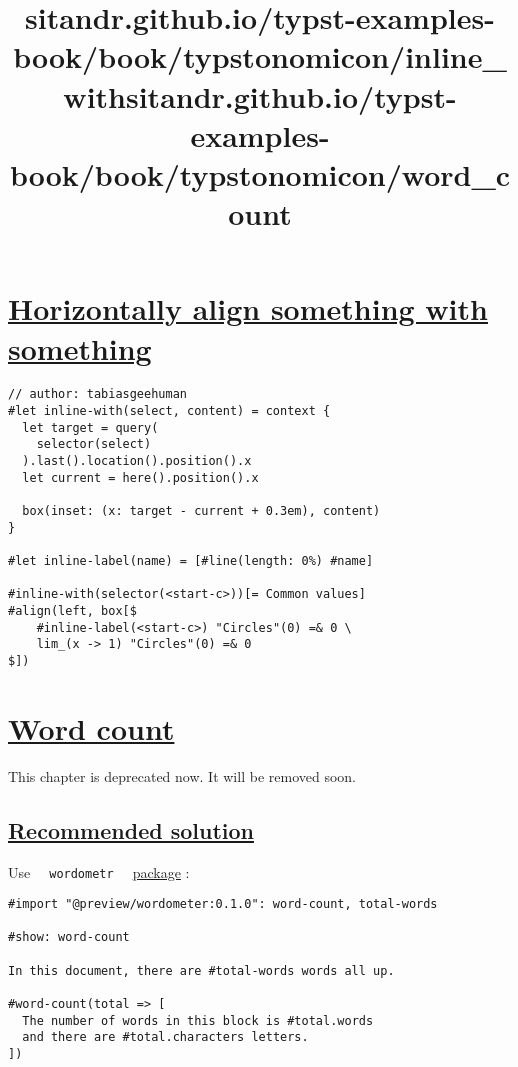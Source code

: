 \title{sitandr.github.io/typst-examples-book/book/typstonomicon/inline_with}

\section{\texorpdfstring{\hyperref[horizontally-align-something-with-something]{Horizontally
align something with
something}}{Horizontally align something with something}}\label{horizontally-align-something-with-something}

\begin{verbatim}
// author: tabiasgeehuman
#let inline-with(select, content) = context {
  let target = query(
    selector(select)
  ).last().location().position().x
  let current = here().position().x

  box(inset: (x: target - current + 0.3em), content)
}

#let inline-label(name) = [#line(length: 0%) #name]

#inline-with(selector(<start-c>))[= Common values]
#align(left, box[$
    #inline-label(<start-c>) "Circles"(0) =& 0 \
    lim_(x -> 1) "Circles"(0) =& 0
$])
\end{verbatim}

\pandocbounded{}


\title{sitandr.github.io/typst-examples-book/book/typstonomicon/word_count}

\section{\texorpdfstring{\hyperref[word-count]{Word
count}}{Word count}}\label{word-count}

This chapter is deprecated now. It will be removed soon.

\subsection{\texorpdfstring{\hyperref[recommended-solution]{Recommended
solution}}{Recommended solution}}\label{recommended-solution}

Use \texttt{\ }{\texttt{\ wordometr\ }}\texttt{\ }
\href{https://github.com/Jollywatt/typst-wordometer}{package} :

\begin{verbatim}
#import "@preview/wordometer:0.1.0": word-count, total-words

#show: word-count

In this document, there are #total-words words all up.

#word-count(total => [
  The number of words in this block is #total.words
  and there are #total.characters letters.
])
\end{verbatim}

